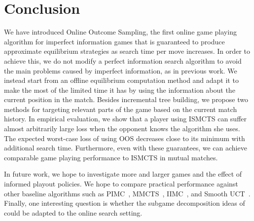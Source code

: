 \documentclass{aamas2015}
\newcounter{mlNoteCounter}
\newcommand{\mlnote}[1]{{\scriptsize \color{darkgreen} $\blacksquare$ \refstepcounter{mlNoteCounter}\textsf{[ML]$_{\arabic{mlNoteCounter}}$:{#1}}}}
\renewcommand{\mlnote}[1]{}
\begin{document}


\section{Conclusion}

\mlnote{Still needs expanding.}
We have introduced Online Outcome Sampling, the first online game playing algorithm for imperfect information games that is guaranteed to produce 
approximate equilibrium strategies as search time per move increases.
In order to achieve this, we do not modify a perfect information search algorithm to avoid the main problems caused by imperfect information, as in previous work.
We instead start from an offline equilibrium computation method and adapt it to make the most of the limited time it has by using the information about the current position in the match.
Besides incremental tree building, we propose two methods for targeting relevant parts of the game based on the current match history.
In empirical evaluation, we show that a player using ISMCTS can suffer almost arbitrarily large loss when the opponent knows the algorithm she uses. 
The expected worst-case loss of using OOS decreases close to its minimum with additional search time.
Furthermore, even with these guarantees, we can achieve comparable game playing performance to ISMCTS in mutual matches.

In future work, we hope to investigate more and larger games and the effect of informed playout policies. 
We hope to compare practical performance against other baseline algorithms such as 
PIMC~\cite{Long10Understanding}, MMCTS~\cite{Auger11Multiple}, IIMC~\cite{Furtak13Recursive}, and Smooth UCT~\cite{Heinrich14}.
Finally, one interesting question is whether the subgame decomposition ideas of~\cite{Burch14Solving,Jackson14} could be 
adapted to the online search setting. 
\end{document}
